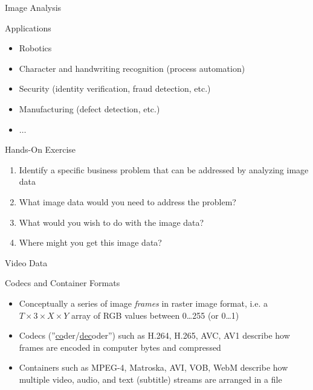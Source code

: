 \documentclass[ignorenonframetext,xcolor=x11names]{beamer}
\begin{document}
\begin{frame}{Image Analysis}
\begin{block}{Applications}
\begin{itemize}
	\item Robotics
	\item Character and handwriting recognition (process automation)
	\item Security (identity verification, fraud detection, etc.)
	\item Manufacturing (defect detection, etc.)
	\item $\ldots$
\end{itemize}
\end{block}

\begin{block}{Hands-On Exercise}
\begin{enumerate}
	\item Identify a specific business problem that can be addressed by analyzing image data
	\item What image data would you need to address the problem?
	\item What would you wish to do with the image data?
	\item Where might you get this image data?
\end{enumerate}
\end{block}
\end{frame}
	
\begin{frame}{Video Data}
\begin{block}{Codecs and Container Formats}
\begin{itemize}
	\item Conceptually a series of image \emph{frames} in raster image format, i.e. a $T \times 3 \times X \times Y$ array of RGB values between 0\ldots255 (or 0\ldots1)
	\item Codecs (''\underline{co}der/\underline{dec}oder'') such as H.264, H.265, AVC, AV1 describe how frames are encoded in computer bytes and compressed
	\item Containers such as MPEG-4, Matroska, AVI, VOB, WebM describe how multiple video, audio, and text (subtitle) streams are arranged in a file
\end{itemize}
\end{block}
\end{frame}
\end{document}
